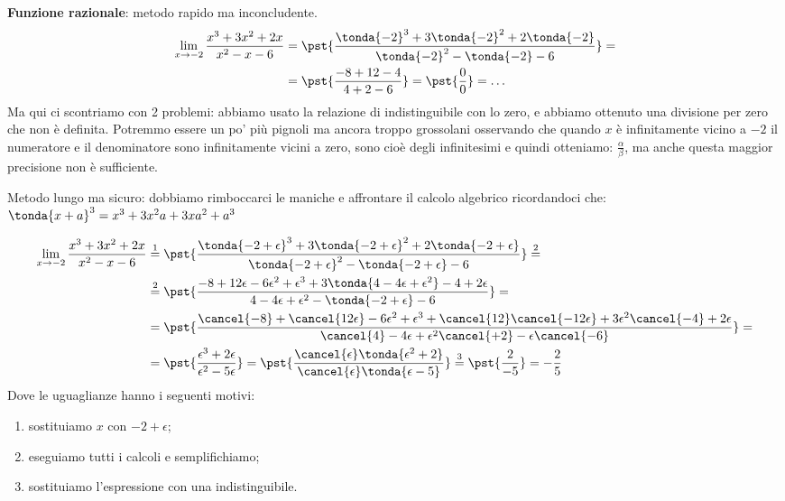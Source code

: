 \begin{esempio}
\textbf{Funzione razionale}: metodo rapido ma inconcludente.
\begin{align*}
\lim_{x \rightarrow -2} \frac{x^3+3x^2+2x}{x^2-x-6} & = 
\pst{\frac
  {\tonda{-2}^3+3\tonda{-2}^2+2\tonda{-2}}
  {\tonda{-2}^2-\tonda{-2}-6}} =\\ 
  &=\pst{\frac{-8+12-4}
              {4+2-6}} = \pst{\frac{0}{0}} = \dots
\end{align*}
Ma qui ci scontriamo con 2 problemi: abbiamo usato la relazione di 
indistinguibile con lo zero, e abbiamo ottenuto una divisione per zero che 
non è definita. Potremmo essere un po' più pignoli ma ancora troppo 
grossolani osservando che quando \(x\) è infinitamente vicino a \(-2\) il 
numeratore e il denominatore sono infinitamente vicini a zero, sono cioè 
degli infinitesimi e quindi otteniamo: \(\frac{\alpha}{\beta}\), ma anche 
questa maggior precisione non è sufficiente.

Metodo lungo ma sicuro:
dobbiamo rimboccarci le maniche e affrontare il calcolo algebrico 
ricordandoci che: \\
\(\tonda{x+a}^3= x^3+3x^2a+3xa^2+a^3\)

\begin{align*}
\lim_{x \rightarrow -2} \frac{x^3+3x^2+2x}{x^2-x-6} & \stackrel{1}{=} 
\pst{\frac
  {\tonda{-2+\epsilon}^3+3\tonda{-2+\epsilon}^2+2\tonda{-2+\epsilon}}
  {\tonda{-2+\epsilon}^2-\tonda{-2+\epsilon}-6}} \stackrel{2}{=}\\ 
  &\stackrel{2}{=}\pst{\frac{-8+12\epsilon-6\epsilon^2+\epsilon^3+
             3\tonda{4-4\epsilon+\epsilon^2}-4+2\epsilon}
             {4-4\epsilon+\epsilon^2-\tonda{-2+\epsilon}-6}} =\\ 
  &=\pst{\frac{\cancel{-8}+\cancel{12\epsilon}-6\epsilon^2+\epsilon^3+
          \cancel{12}\cancel{-12\epsilon}+3\epsilon^2\cancel{-4}+2\epsilon}
             {\cancel{4}-4\epsilon+
              \epsilon^2\cancel{+2}-\epsilon\cancel{-6}}}=\\ 
  &=\pst{\frac{\epsilon^3+2\epsilon}{\epsilon^2-5\epsilon}} = 
    \pst{\frac{\cancel{\epsilon} \tonda{\epsilon^2+2}}
             {\cancel{\epsilon} \tonda{\epsilon-5}}}  \stackrel{3}{=} 
    \pst{\frac{2}{-5}} = -\frac{2}{5}
\end{align*}
Dove le uguaglianze hanno i seguenti motivi:
\begin{enumerate} [nosep]
 \item sostituiamo \(x\) con \(-2+\epsilon\);
 \item eseguiamo tutti i calcoli e semplifichiamo;
 \item sostituiamo l'espressione con una indistinguibile.
\end{enumerate}
\end{esempio}

